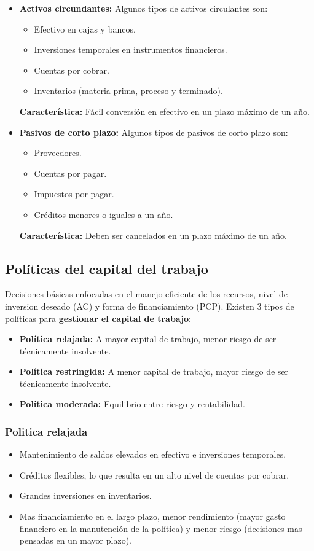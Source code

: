 \documentclass{templateNote}
\begin{document}
\begin{itemize}
    \item \textbf{Activos circundantes:} Algunos tipos de activos circulantes son:
    \begin{itemize}
        \item Efectivo en cajas y bancos.
        \item Inversiones temporales en instrumentos financieros.
        \item Cuentas por cobrar.
        \item Inventarios (materia prima, proceso y terminado).
    \end{itemize}
    \textbf{Característica:} Fácil conversión en efectivo en un plazo máximo de un año.
    \item \textbf{Pasivos de corto plazo:} Algunos tipos de pasivos de corto plazo son:
    \begin{itemize}
        \item Proveedores.
        \item Cuentas por pagar.
        \item Impuestos por pagar. 
        \item Créditos menores o iguales a un año.
    \end{itemize}
    \textbf{Característica:} Deben ser cancelados en un plazo máximo de un año.
\end{itemize}
\subsection{Políticas del capital del trabajo}
\noindent Decisiones básicas enfocadas en el manejo eficiente de los recursos, nivel de inversion deseado (AC) y forma de financiamiento (PCP). Existen 3 tipos de políticas para \textbf{gestionar el capital de trabajo}:
\begin{itemize}
    \item \textbf{Política relajada:} A mayor capital de trabajo, menor riesgo de ser técnicamente insolvente.
    \item \textbf{Política restringida:} A menor capital de trabajo, mayor riesgo de ser técnicamente insolvente.
    \item \textbf{Política moderada:} Equilibrio entre riesgo y rentabilidad.
\end{itemize}

\subsubsection{Politica relajada}
\begin{itemize}
    \item Mantenimiento de saldos elevados en efectivo e inversiones temporales.
    \item Créditos flexibles, lo que resulta en un alto nivel de cuentas por cobrar.
    \item Grandes inversiones en inventarios.
    \item Mas financiamiento en el largo plazo, menor rendimiento (mayor gasto financiero en la manutención de la política) y menor riesgo (decisiones mas pensadas en un mayor plazo). 
\end{itemize}
\end{document}
